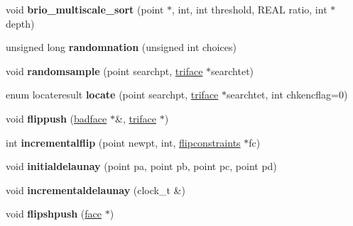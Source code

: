 \begin{DoxyCompactItemize}
\mbox{\label{classtetgenmesh_a3f09dd9fb2d975c75397a92aa6128565}} 
void {\bfseries brio\+\_\+multiscale\+\_\+sort} (point $\ast$, int, int threshold, R\+E\+AL ratio, int $\ast$depth)
\item 
\mbox{\label{classtetgenmesh_a0ae35b219eb4a0d1e0c14f9759cd6563}} 
unsigned long {\bfseries randomnation} (unsigned int choices)
\item 
\mbox{\label{classtetgenmesh_aa05e91020e6e60c4bc589571c64ae646}} 
void {\bfseries randomsample} (point searchpt, \hyperlink{classtetgenmesh_1_1triface}{triface} $\ast$searchtet)
\item 
\mbox{\label{classtetgenmesh_ae66f3ff9ebd1e9836e95d83e44abef80}} 
enum locateresult {\bfseries locate} (point searchpt, \hyperlink{classtetgenmesh_1_1triface}{triface} $\ast$searchtet, int chkencflag=0)
\item 
\mbox{\label{classtetgenmesh_a5ffeb14717bdf9867aa29a9d9487013f}} 
void {\bfseries flippush} (\hyperlink{classtetgenmesh_1_1badface}{badface} $\ast$\&, \hyperlink{classtetgenmesh_1_1triface}{triface} $\ast$)
\item 
\mbox{\label{classtetgenmesh_a2388d9669cc9bb2a68943633bd5148ef}} 
int {\bfseries incrementalflip} (point newpt, int, \hyperlink{classtetgenmesh_1_1flipconstraints}{flipconstraints} $\ast$fc)
\item 
\mbox{\label{classtetgenmesh_a9b2f957a884b39c4d93c8695fa4b59d7}} 
void {\bfseries initialdelaunay} (point pa, point pb, point pc, point pd)
\item 
\mbox{\label{classtetgenmesh_a5a5a0513d0bea7aa457eb0bc5fad1b02}} 
void {\bfseries incrementaldelaunay} (clock\+\_\+t \&)
\item 
\mbox{\label{classtetgenmesh_a5a83480cb33ea6ceebb125e20d33c324}} 
void {\bfseries flipshpush} (\hyperlink{classtetgenmesh_1_1face}{face} $\ast$)
\item 
\mbox{\label{classtetgenmesh_ac34f0cd148accd132b491f9c6145c6f6}} 

\end{DoxyCompactItemize}
